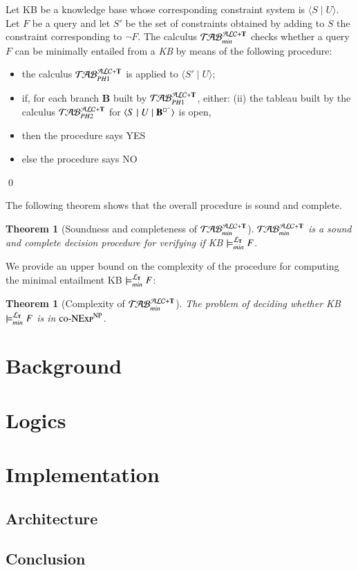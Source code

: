 \documentclass[a4paper, 11pt, oneside]{elsarticle}
\newcommand{\tip}{{\bf T}}
\newcommand{\nott} {\lnot}
\newcommand{\tc} {\mid}
\newcommand{\bbox}{\square}
\newcommand{\sx} {\langle}
\newcommand{\dx} {\rangle}
\newcommand{\ellet} {\mathcal{L}_{\bf T}}
\newcommand{\nuovoc}{\mathrel{{\mathcal{T}\!\mathcal{AB}}}_{min}^{\mathcal{ALC}+\mbox{\scriptsize $\tip$}}}
\newcommand{\primo}{\mathrel{{\mathcal{T}\!\mathcal{AB}}}_{PH 1}^{\mathcal{ALC}+\mbox{\scriptsize $\tip$}}}
\newcommand{\secondo}{\mathrel{{\mathcal{T}\!\mathcal{AB}}}_{PH 2}^{\mathcal{ALC}+\mbox{\scriptsize $\tip$}}}
\newenvironment{definition}
{\begin{defi} \rm}{\qed \end{defi}}
\newtheorem{theorem}{Theorem}
\newcounter{posu}
\newtheorem{theorem}[posu]{Theorem}
\newtheorem{definition}[posu]{Definition}
\begin{document}
\begin{definition}\label{def processo}
Let KB be a knowledge base whose corresponding constraint system is $\sx S \tc U \dx$. Let $F$ be a query and let $S'$ be the set of
constraints obtained by adding to $S$ the constraint corresponding to $\nott F$.
The calculus $\nuovoc$ checks whether a query $F$ can be minimally entailed from a \emph{KB} by means of the following procedure:
\begin{itemize}
\item the calculus $\primo$ is applied to $\sx S' \tc U
\dx$;  \item if, for each branch {\bf B} built by $\primo$,
either:  \subitem(ii) {the
tableau built by the calculus $\secondo$ for $\sx S \tc U \tc {\bf
B}^{\bbox^{-}} \dx$ is open, } \item[] then the procedure says \textsc{YES}
\item[] else the procedure says \textsc{NO}
\end{itemize}
\end{definition}

\noindent The following theorem shows that the overall procedure is sound
and complete.


\begin{theorem}[Soundness and completeness of $\nuovoc$]\label{Soundness e completeness nuovoc}
$\nuovoc$ is  a sound and complete decision procedure for
verifying if KB $\models_{min}^{\ellet} F$.
\end{theorem}

We provide an upper bound on the complexity of the
procedure for computing the minimal entailment KB
$\models_{min}^{\ellet} F$:

\begin{theorem}[Complexity of $\nuovoc$]\label{overall complexity}
The problem of deciding whether \emph{KB} $\models_{min}^{\ellet} F$ is
in $\textsc{co-NExp}^\textsc{NP}$.
\end{theorem}



\section{Background}
\section{Logics}
\section{Implementation}

\subsection{Architecture}

\subsection{Conclusion}




\newpage



\end{document}
